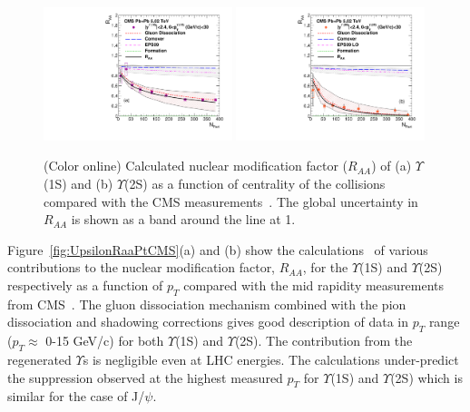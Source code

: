 {\begin{figure}
\includegraphics[width=0.49\textwidth]{Figures/Fig20l_CMS_Y1SRAANPart_Shade.pdf}
\includegraphics[width=0.49\textwidth]{Figures/Fig20r_CMS_Y2SRAANPart_Shade.pdf}
\caption{(Color online) Calculated nuclear modification factor ($R_{AA}$) \cite{Kumar:2019xdj} of 
  (a) $\Upsilon$(1S) and (b) $\Upsilon$(2S) as a function of centrality of the 
  collisions compared with the CMS measurements~\cite{CMS:2018zza}.%
  The global uncertainty in $R_{AA}$ is shown as a band around the line at 1.
}
\label{fig:UpsilonRaaNPartCMS}
\end{figure}


Figure~\ref{fig:UpsilonRaaPtCMS}(a) and (b) show the calculations~\cite{Kumar:2019xdj}
of various contributions to
the nuclear modification factor, $R_{AA}$, for the $\Upsilon$(1S) and $\Upsilon$(2S)
respectively as a function of $p_T$ compared with the mid rapidity measurements from
CMS~\cite{CMS:2018zza}.  
The gluon dissociation mechanism combined with the pion dissociation and shadowing
corrections gives good description of data in $p_{T}$ range ($p_{T}\approx$ 0-15 GeV/c)
for both $\Upsilon$(1S) and $\Upsilon$(2S).
The contribution from the regenerated $\Upsilon$s is negligible even at LHC energies.
The calculations under-predict the suppression observed at the highest measured
$p_{T}$ for $\Upsilon$(1S) and $\Upsilon$(2S) which is similar for the case
of J/$\psi$.

}
